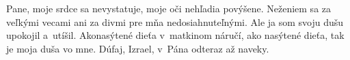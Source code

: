Pane, moje srdce sa nevystatuje,
moje oči nehľadia povýšene.
\versseparator
Neženiem sa za veľkými vecami
ani za divmi pre mňa nedosiahnuteľnými.
\versseparator
Ale ja som svoju dušu
upokojil a~utíšil.
\versseparator
Akonasýtené dieťa v~matkinom náručí,
ako nasýtené dieťa, tak je moja duša vo mne.
\versseparator
Dúfaj, Izrael, v~Pána
odteraz až naveky.